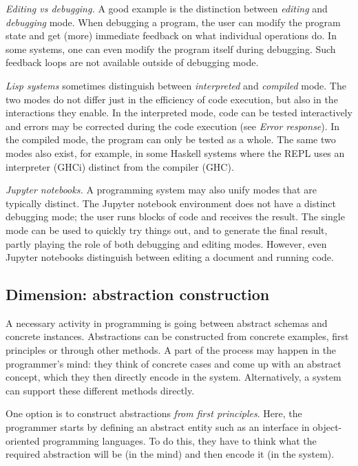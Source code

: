 \documentclass[ twoside,openright,titlepage,numbers=noenddot,headinclude,footinclude,cleardoublepage=empty,abstract=on,
                BCOR=5mm,paper=a4,fontsize=11pt
                ]{scrreprt}
\theoremstyle{definition}
\begin{document}
\emph{Editing vs debugging.} A good example is the distinction between
\emph{editing} and \emph{debugging} mode. When debugging a program, the
user can modify the program state and get (more) immediate feedback on
what individual operations do. In some systems, one can even modify the
program itself during debugging. Such feedback loops are not available
outside of debugging mode.

\emph{Lisp systems} sometimes distinguish between \emph{interpreted} and
\emph{compiled} mode. The two modes do not differ just in the efficiency
of code execution, but also in the interactions they enable. In the
interpreted mode, code can be tested interactively and errors may be
corrected during the code execution (see \emph{Error response}). In the
compiled mode, the program can only be tested as a whole. The same two
modes also exist, for example, in some Haskell systems where the REPL
uses an interpreter (GHCi) distinct from the compiler (GHC).

\emph{Jupyter notebooks.} A programming system may also unify modes that
are typically distinct. The Jupyter notebook environment does not have a
distinct debugging mode; the user runs blocks of code and receives the
result. The single mode can be used to quickly try things out, and to
generate the final result, partly playing the role of both debugging and
editing modes. However, even Jupyter notebooks distinguish between
editing a document and running code.

\hypertarget{dimension-abstraction-construction}{\subsection{Dimension: abstraction
construction}\label{dimension-abstraction-construction}}

A necessary activity in programming is going between abstract schemas
and concrete instances. Abstractions can be constructed from concrete
examples, first principles or through other methods. A part of the
process may happen in the programmer's mind: they think of concrete
cases and come up with an abstract concept, which they then directly
encode in the system. Alternatively, a system can support these
different methods directly.

One option is to construct abstractions \emph{from first principles}.
Here, the programmer starts by defining an abstract entity such as an
interface in object-oriented programming languages. To do this, they
have to think what the required abstraction will be (in the mind) and
then encode it (in the system).
\end{document}

